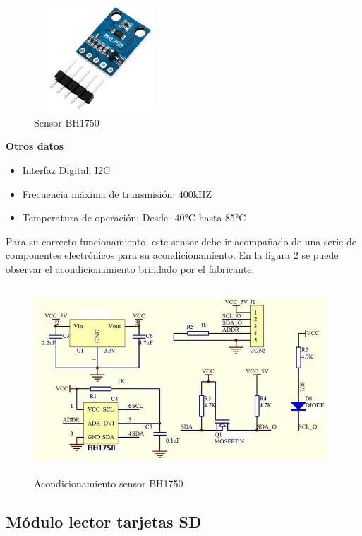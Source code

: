 \begin{figure}[H]
    \centering
    \includegraphics[width=5cm, height=4cm]{imagenes/Sensor BH1750.jpg}
    \caption{Sensor BH1750}
    \label{imag:BH1750}
 \end{figure}

\textbf{Otros datos}

\begin{itemize}
    \item Interfaz Digital: I2C
    \item Frecuencia máxima de transmisión: 400kHZ
    \item Temperatura de operación: Desde -40°C hasta 85°C
\end{itemize}

Para su correcto funcionamiento, este sensor debe ir acompañado de una serie de componentes electrónicos para su acondicionamiento.
En la figura \ref{imag:acondicionamiento_BH1750} se puede observar el acondicionamiento brindado por el fabricante.

\begin{figure}[H]
    \centering
    \includegraphics[width=11cm, height=7cm]{imagenes/acondicionamientos sensor BH1750.jpg}
    \caption{Acondicionamiento sensor BH1750}
    \label{imag:acondicionamiento_BH1750}
\end{figure}

\subsection{Módulo lector tarjetas SD}

